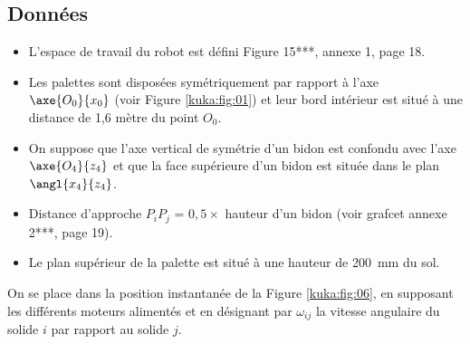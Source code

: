 \subsection{Données} 
\begin{itemize}
\item L’espace de travail du robot est défini Figure 15***, annexe 1, page 18. 
\item Les palettes sont disposées symétriquement par rapport à l’axe $\axe{O_0}{x_0}$ (voir Figure \ref{kuka:fig:01}) et leur bord intérieur est situé à une distance de 1,6 mètre du point $O_0$. 
\item On suppose que l’axe vertical de symétrie d’un bidon est confondu avec l’axe $\axe{O_4}{z_4}$
et que la face supérieure d’un bidon est située dans le plan $\angl{x_4}{z_4}$. 
\item Distance d’approche $P_iP_j$ = $0,5 \times$ hauteur d’un bidon (voir grafcet annexe 2***, page 19). 
\item Le plan supérieur de la palette est situé à une hauteur de \SI{200}{mm} du sol. 
\end{itemize}







On se place dans la position instantanée de la Figure \ref{kuka:fig:06}, en supposant les 
différents moteurs alimentés et en désignant par $\omega_{ij}$ la vitesse angulaire du solide $i$ par 
rapport au solide $j$.






